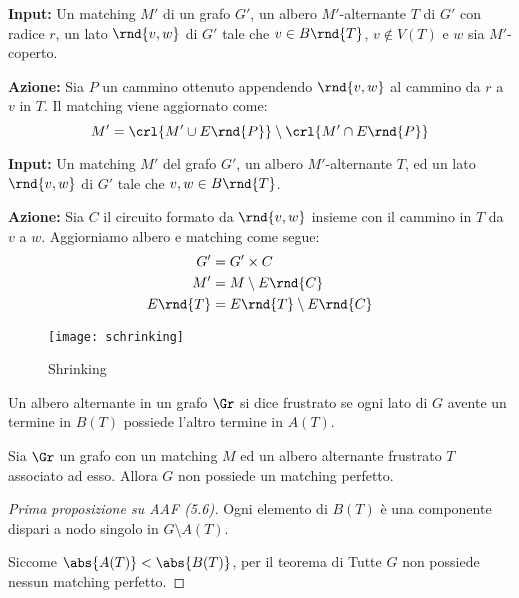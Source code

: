 \documentclass[\main/main.tex]{subfiles}
\begin{document}
\begin{definition}
	\textbf{Input:} Un matching \(M'\) di un grafo \(G'\), un albero \(M'\)-alternante \(T\) di \(G'\) con radice \(r\), un lato \(\rnd{v, w}\) di \(G'\) tale che \(v \in B\rnd{T}\), \(v \not\in V(T)\) e \(w\) sia \(M'\)-coperto.

	\textbf{Azione:} Sia \(P\) un cammino ottenuto appendendo \(\rnd{v, w}\) al cammino da \(r\) a \(v\) in \(T\). Il matching viene aggiornato come:
	\[
		M' = \crl{M'\cup E\rnd{P}}\setminus\crl{M' \cap E\rnd{P}}
	\]
\end{definition}
\begin{definition}
	\textbf{Input:} Un matching \(M'\) del grafo \(G'\), un albero \(M'\)-alternante \(T\), ed un lato \(\rnd{v, w}\) di \(G'\) tale che \(v, w \in B\rnd{T}\).

	\textbf{Azione:} Sia \(C\) il circuito formato da \(\rnd{v, w}\) insieme con il cammino in \(T\) da \(v\) a \(w\). Aggiorniamo albero e matching come segue:
	\begin{align*}
		G'       & = G' \times C                 \\
		M'       & = M\setminus E\rnd{C}         \\
		E\rnd{T} & = E\rnd{T} \setminus E\rnd{C}
	\end{align*}
	\begin{figure}
		\texttt{[image: schrinking]}
		\caption{Shrinking}
	\end{figure}
\end{definition}
\begin{definition}
	Un albero alternante in un grafo \(\Gr \) si dice frustrato se ogni lato di \(G\) avente un termine in \(B(T)\) possiede l'altro termine in \(A(T)\).
\end{definition}
\begin{proposition}
	Sia \(\Gr \) un grafo con un matching \(M\) ed un albero alternante frustrato \(T\) associato ad esso. Allora \(G\) non possiede un matching perfetto.
\end{proposition}
\begin{proof}[Prima proposizione su AAF (5.6)]
	Ogni elemento di \(B(T)\) è una componente dispari a nodo singolo in \(G \setminus A(T)\).

	Siccome \(\abs{A(T)} < \abs{B(T)}\), per il teorema di Tutte \(G\) non possiede nessun matching perfetto.
\end{proof}
\end{document}
